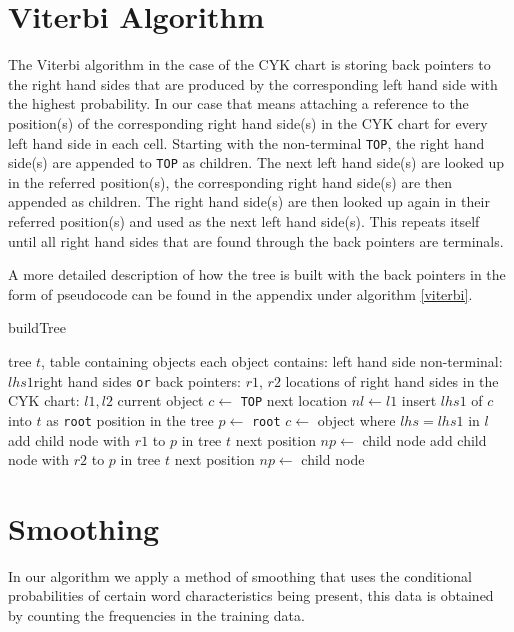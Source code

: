 \documentclass[11pt,twocolumn]{article}
\begin{document}
\section{Viterbi Algorithm}
The Viterbi algorithm in the case of the CYK chart is storing back pointers to the right hand sides that are produced by the corresponding left hand side with the highest probability. In our case that means attaching a reference to the position(s) of the corresponding right hand side(s) in the CYK chart for every left hand side in each cell. Starting with the non-terminal \texttt{TOP}, the right hand side(s) are appended to \texttt{TOP} as children. The next left hand side(s) are looked up in the referred position(s), the corresponding right hand side(s) are then appended as children. The right hand side(s) are then looked up again in their referred position(s) and used as the next left hand side(s). This repeats itself until all right hand sides that are found through the back pointers are terminals.

A more detailed description of how the tree is built with the back pointers in the form of pseudocode can be found in the appendix under algorithm \ref{viterbi}.
\begin{algorithm}[!htb]
\caption{buildTree}
\label{viterbi}
\begin{algorithmic}[1]
\Require tree $t$, table containing objects
\Ensure each object contains: \newline
left hand side non-terminal: $lhs1$\newline right hand sides \texttt{or} back pointers: $r1$, $r2$\newline
locations of right hand sides in the CYK chart: $l1, l2$
\State current object $c \gets$ \texttt{TOP} 
\State next location $nl \gets l1$
\State insert $lhs1$ of $c$ into $t$ as \texttt{root}
\State position in the tree $p \gets$ \texttt{root}
\State {}
\State $c \gets$ object where $lhs=lhs1$ in $l$
\State add child node with $r1$ to $p$ in tree $t$
\State next position $np \gets$ child node
\State {} 
\State add child node with $r2$ to $p$ in tree $t$
\State next position $np \gets$ child node
\State {} 
\EndIf
\EndProcedure
\end{algorithmic}
\end{algorithm}

\section{Smoothing}
In our algorithm we apply a method of smoothing that uses the conditional probabilities of certain word characteristics being present, this data is obtained by counting the frequencies in the training data.
\end{document}
